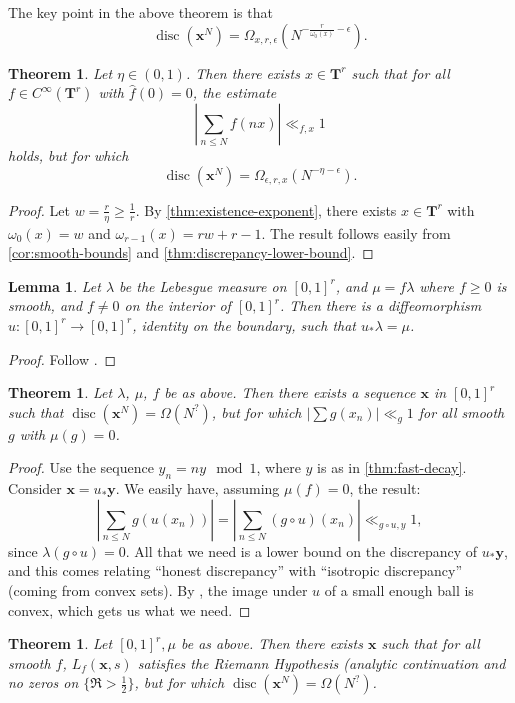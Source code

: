 \documentclass{article}
\DeclareMathOperator{\disc}{disc}
\newcommand{\bT}{\mathbf{T}}
\newcommand{\bx}{{\boldsymbol x}}
\newcommand{\by}{{\boldsymbol y}}
\newtheorem{theorem}[subsection]{Theorem}
\newtheorem{lemma}[subsection]{Lemma}
\theoremstyle{definition}
\begin{document}
The key point in the above theorem is that 
\[
	\disc(\bx^N) = \Omega_{x,r,\epsilon}\left(N^{-\frac{r}{\omega_0(x)}-\epsilon}\right) .
\]

\begin{theorem}\label{thm:fast-decay}
Let $\eta\in (0,1)$. Then there exists $x\in \bT^r$ such that for all 
$f\in C^\infty(\bT^r)$ with $\widehat f(0)=0$, the estimate 
\[
	\left| \sum_{n\leqslant N} f(n x)\right|\ll_{f,x} 1
\]
holds, but for which 
\[
	\disc(\bx^N) = \Omega_{\epsilon,r,x}\left(N^{-\eta - \epsilon}\right) .
\]
\end{theorem}
\begin{proof}
Let $w=\frac{r}{\eta} \geqslant \frac 1 r$. By 
\autoref{thm:existence-exponent}, there exists $x\in \bT^r$ with 
$\omega_0(x)=w$ and $\omega_{r-1}(x)=r w+r-1$. The result follows easily 
from \autoref{cor:smooth-bounds} and \autoref{thm:discrepancy-lower-bound}. 
\end{proof}


\begin{lemma}
Let $\lambda$ be the Lebesgue measure on $[0,1]^r$, and $\mu=f\lambda$ 
where $f\geqslant 0$ is smooth, and $f\ne 0$ on the interior of $[0,1]^r$. Then 
there is a diffeomorphism $u\colon [0,1]^r\to [0,1]^r$, identity on the 
boundary, such that $u_\ast \lambda = \mu$. 
\end{lemma}
\begin{proof}
Follow \cite{moser-1965}. 
\end{proof}

\begin{theorem}
Let $\lambda$, $\mu$, $f$ be as above. Then there exists a sequence 
$\bx$ in $[0,1]^r$ such that $\disc(\bx^N)=\Omega(N^?)$, but for which 
$|\sum g(x_n)| \ll_g 1$ for all smooth $g$ with $\mu(g)=0$. 
\end{theorem}
\begin{proof}
Use the sequence $y_n=n y\mod 1$, where $y$ is as in \autoref{thm:fast-decay}. 
Consider $\bx=u_\ast \by$. We easily have, assuming $\mu(f)=0$, the result:
\[
	\left|\sum_{n\leqslant N} g(u(x_n))\right| = \left| \sum_{n\leqslant N} (g\circ u)(x_n)\right| \ll_{g\circ u,y} 1 ,
\]
since $\lambda(g\circ u)=0$. All that we need is a lower bound on the discrepancy 
of $u_\ast \by$, and this comes relating ``honest discrepancy'' with 
``isotropic discrepancy'' (coming from convex sets). By 
\cite{polyak-2001}, the image under $u$ of a small enough ball is convex, 
which gets us what we need.
\end{proof}

\begin{theorem}
Let $[0,1]^r,\mu$ be as above. Then there exists $\bx$ such that for all smooth 
$f$, $L_f(\bx,s)$ satisfies the Riemann Hypothesis (analytic continuation and 
no zeros on $\{\Re>\frac 1 2\}$, but for which 
$\disc(\bx^N)=\Omega(N^?)$. 
\end{theorem}





\printbibliography
\end{document}
